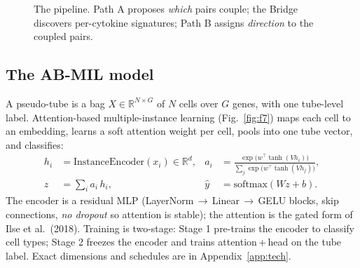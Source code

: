 \documentclass[11pt]{article}
\newcommand{\code}[1]{\texttt{\small #1}}
\newcommand{\cross}{\code{cross\_asym}}
\begin{document}
\begin{figure}[h]\centering
{}
\caption{The pipeline. Path A proposes \emph{which} pairs couple; the Bridge
discovers per-cytokine signatures; Path B assigns \emph{direction} to the coupled
pairs.}\label{fig:f6}
\end{figure}

\subsection{The AB-MIL model}\label{sec:mil}
A pseudo-tube is a bag $X\in\mathbb{R}^{N\times G}$ of $N$ cells over $G$ genes,
with one tube-level label. Attention-based multiple-instance learning
(Fig.~\ref{fig:f7}) maps each cell to an embedding, learns a soft attention weight
per cell, pools into one tube vector, and classifies:
\begin{align}
h_i &= \mathrm{InstanceEncoder}(x_i)\in\mathbb{R}^{d}, &
a_i &= \frac{\exp\!\big(w^{\top}\tanh(V h_i)\big)}{\sum_j \exp\!\big(w^{\top}\tanh(V h_j)\big)},\\
z &= \textstyle\sum_i a_i\, h_i, &
\hat y &= \mathrm{softmax}(W z + b).
\end{align}
The encoder is a residual MLP (LayerNorm\,$\to$\,Linear\,$\to$\,GELU blocks, skip
connections, \emph{no dropout} so attention is stable); the attention is the gated
form of Ilse et al.\ (2018). Training is two-stage: Stage 1 pre-trains the encoder
to classify cell types; Stage 2 freezes the encoder and trains attention\,+\,head
on the tube label. Exact dimensions and schedules are in Appendix~\ref{app:tech}.
\end{document}
